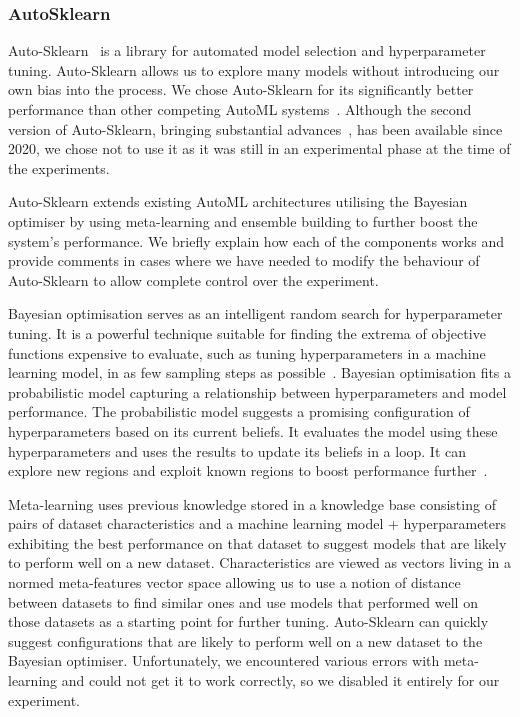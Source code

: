\documentclass[conference]{IEEEtran}
\begin{document}
\subsubsection{AutoSklearn}
\label{subsubsection:auto-sklearn}

Auto-Sklearn~\cite{auto-sklearn-1.0} is a library for automated model selection and hyperparameter
tuning. Auto-Sklearn allows us to explore many models without introducing our own bias into the
process. We chose Auto-Sklearn for its significantly better performance than other competing AutoML
systems~\cite{auto-sklearn-1.0}. Although the second version of Auto-Sklearn, bringing substantial
advances~\cite{auto-sklearn-2.0}, has been available since 2020, we chose not to use it as it was
still in an experimental phase at the time of the experiments.

Auto-Sklearn extends existing AutoML architectures utilising the Bayesian optimiser by using
meta-learning and ensemble building to further boost the system's performance. We briefly explain
how each of the components works and provide comments in cases where we have needed to modify the
behaviour of Auto-Sklearn to allow complete control over the experiment.

Bayesian optimisation serves as an intelligent random search for hyperparameter tuning. It is a
powerful technique suitable for finding the extrema of objective functions expensive to evaluate,
such as tuning hyperparameters in a machine learning model, in as few sampling steps as
possible~\cite{bayesian-opt}. Bayesian optimisation fits a probabilistic model capturing a
relationship between hyperparameters and model performance. The probabilistic model suggests a
promising configuration of hyperparameters based on its current beliefs. It evaluates the model
using these hyperparameters and uses the results to update its beliefs in a loop. It can explore
new regions and exploit known regions to boost performance further~\cite{auto-sklearn-1.0}.

Meta-learning uses previous knowledge stored in a knowledge base consisting of pairs of dataset
characteristics and a machine learning model + hyperparameters exhibiting the best performance on
that dataset to suggest models that are likely to perform well on a new dataset. Characteristics
are viewed as vectors living in a normed meta-features vector space allowing us to use a notion of
distance between datasets to find similar ones and use models that performed well on those datasets
as a starting point for further tuning. Auto-Sklearn can quickly suggest configurations that are
likely to perform well on a new dataset to the Bayesian optimiser. Unfortunately, we encountered
various errors with meta-learning and could not get it to work correctly, so we disabled it
entirely for our experiment.
\end{document}
